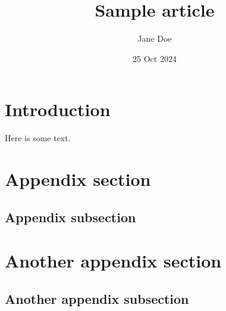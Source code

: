 \documentclass{amsart}
\title{Sample article}
\author{Jane Doe}
\date{25 Oct 2024}
\begin{document}
\maketitle

\section{Introduction}

Here is some text.

\appendix

\section{Appendix section}

\subsection{Appendix subsection}

\section{Another appendix section}

\subsection{Another appendix subsection}
\end{document}
